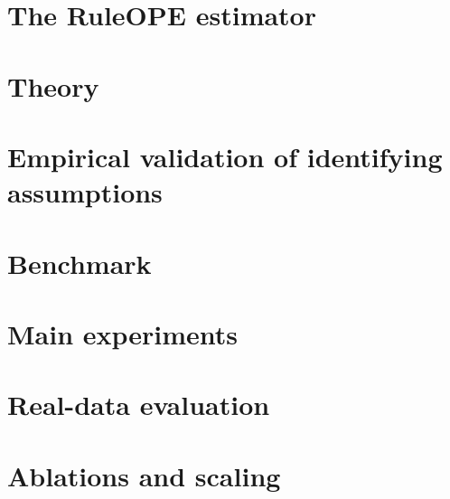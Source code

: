 \documentclass[11pt]{article}
\begin{document}
\section{The RuleOPE estimator}
\label{sec:estimator}


\section{Theory}
\label{sec:theory}


\section{Empirical validation of identifying assumptions}
\label{sec:validation}


\section{Benchmark}
\label{sec:benchmark}


\section{Main experiments}
\label{sec:exp}


\section{Real-data evaluation}
\label{sec:real}


\section{Ablations and scaling}
\label{sec:abl}


\end{document}
